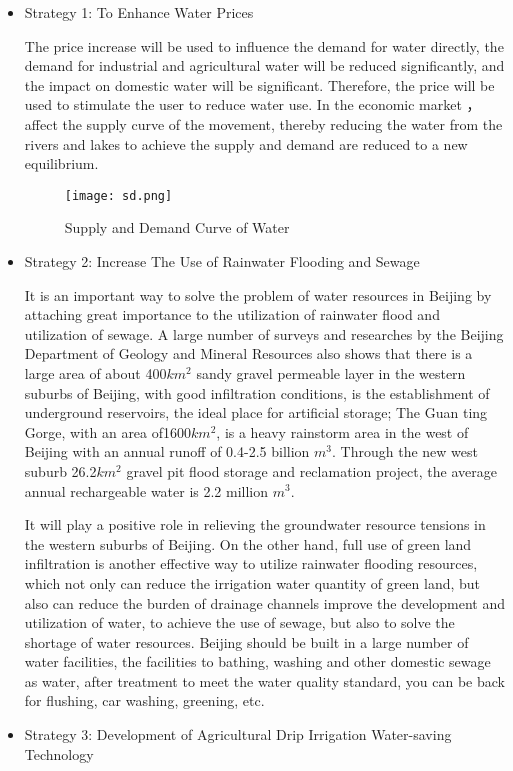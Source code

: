 \documentclass{mcmthesis}
\begin{document}
\begin{itemize}
	\item Strategy 1: To Enhance Water Prices
	
	\par The price increase will be used to influence the demand for water directly, the demand for industrial and agricultural water will be reduced significantly, and the impact on domestic water will be significant. Therefore, the price will be used to stimulate the user to reduce water use. In the economic market ，affect the supply curve of the movement, thereby reducing the water from the rivers and lakes to achieve the supply and demand are reduced to a new equilibrium.
	\begin{figure}[h]
	\small
	\centering
	\texttt{[image: sd.png]}
	\caption{Supply and Demand Curve of Water} \label{fig:Water Supply and Demand}
	\end{figure}
	
	\item Strategy 2: Increase The Use of Rainwater Flooding and Sewage
	
	\par It is an important way to solve the problem of water resources in Beijing by attaching great importance to the utilization of rainwater flood and utilization of sewage. A large number of surveys and researches by the Beijing Department of Geology and Mineral Resources also shows that there is a large area of ​​about 400$km^2$ sandy gravel permeable layer in the western suburbs of Beijing, with good infiltration conditions, is the establishment of underground reservoirs, the ideal place for artificial storage; The Guan ting Gorge, with an area of ​​1600$km^2$, is a heavy rainstorm area in the west of Beijing with an annual runoff of 0.4-2.5 billion $m^3$. Through the new west suburb 26.2$km^2$ gravel pit flood storage and reclamation project, the average annual rechargeable water is 2.2 million $m^3$. 
	
	\par It will play a positive role in relieving the groundwater resource tensions in the western suburbs of Beijing. On the other hand, full use of green land infiltration is another effective way to utilize rainwater flooding resources, which not only can reduce the irrigation water quantity of green land, but also can reduce the burden of drainage channels improve the development and utilization of water, to achieve the use of sewage, but also to solve the shortage of water resources. Beijing should be built in a large number of water facilities, the facilities to bathing, washing and other domestic sewage as water, after treatment to meet the water quality standard, you can be back for flushing, car washing, greening, etc.
	\item Strategy 3: Development of Agricultural Drip Irrigation Water-saving Technology
	

\end{itemize}
\end{document}
